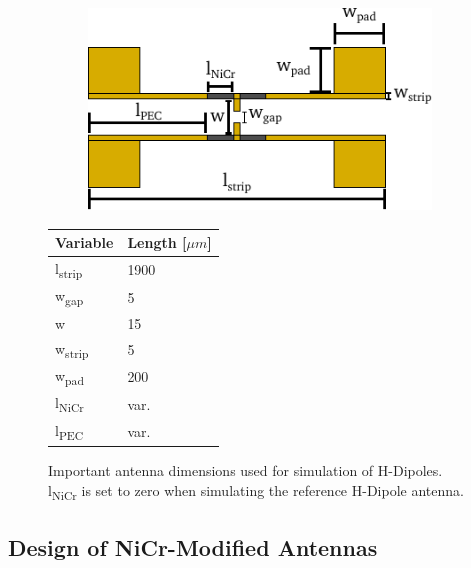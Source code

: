 \begin{figure}[!]
    \centering
        \begin{subfigure}[c]{0.45\textwidth}
        \centering
        \includegraphics[width=\linewidth]{figures/sim_NICR_abmessungen.pdf}
        \label{fig:NICR}
    \end{subfigure}
    \hspace{0.1em}
    \begin{subtable}[c]{0.45\textwidth}
        \centering
        \begin{tabular}{ll}
        \toprule
        Variable & Length [$\mu m$]\\
        \midrule
        l\textsubscript{strip} & 1900 \\
        w\textsubscript{gap} & 5 \\
        w & 15 \\
        w\textsubscript{strip} & 5 \\
        w\textsubscript{pad} & 200 \\
        l\textsubscript{NiCr} & var. \\
        l\textsubscript{PEC} & var. \\
        \bottomrule
        \end{tabular}
        \label{tab:table1}
    \end{subtable}
    \caption{Important antenna dimensions used for simulation of H-Dipoles. l\textsubscript{NiCr} is set to zero when simulating the reference H-Dipole antenna.}
    \label{fig:sim_dimensions}
\end{figure}

\subsection{Design of NiCr-Modified Antennas}

